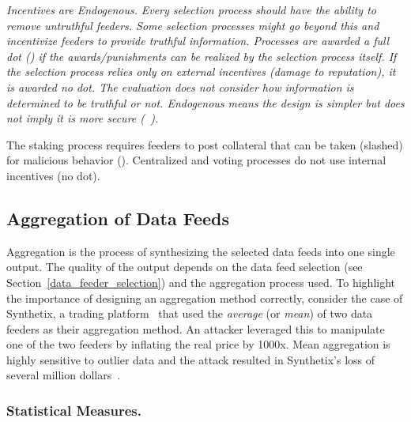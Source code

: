 \emph{Incentives are Endogenous.} \textit{Every selection process should have the ability to remove untruthful feeders. Some selection processes might go beyond this and incentivize feeders to provide truthful information. Processes are awarded a full dot (\full) if the awards/punishments can be realized by the selection process itself. If the selection process relies only on external incentives (\eg damage to reputation), it is awarded no dot. The evaluation does not consider how information is determined to be truthful or not. Endogenous means the design is simpler but does not imply it is more secure (\cf~\cite{FoBo19}).}

The staking process requires feeders to post collateral that can be taken (\ie slashed) for malicious behavior (\full). Centralized and voting processes do not use internal incentives (no dot).


\subsection{Aggregation of Data Feeds}\label{aggregation} 

Aggregation is the process of synthesizing the selected data feeds into one single output. The quality of the output depends on the data feed selection (see Section~\ref{data_feeder_selection}) and the aggregation process used. To highlight the importance of designing an aggregation method correctly, consider the case of Synthetix, a trading platform~\cite{synthetix} that used the \textit{average} (or \textit{mean}) of two data feeders as their aggregation method. An attacker leveraged this to manipulate one of the two feeders by inflating the real price by 1000x. Mean aggregation is highly sensitive to outlier data and the attack resulted in Synthetix's loss of several million dollars~\cite{synthetixIncident}.

\subsubsection{Statistical Measures.}

